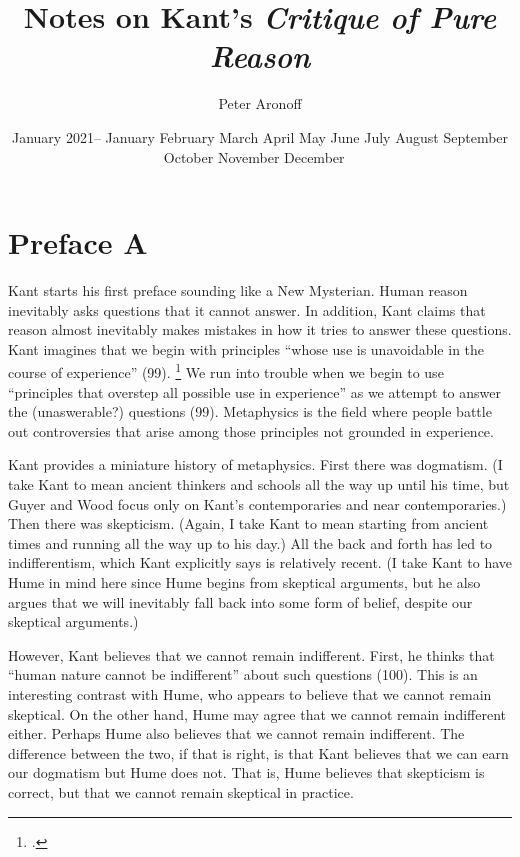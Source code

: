 \documentclass[12pt,letterpaper]{article}
\newcommand{\MONTH}{%
  \ifcase\the\month
  \or January%
  \or February%
  \or March%
  \or April%
  \or May%
  \or June%
  \or July%
  \or August%
  \or September%
  \or October%
  \or November%
  \or December%
  \fi}
\begin{document}
\begin{titlepage}
\title{Notes on Kant's \textit{Critique of Pure Reason}}
\author{Peter Aronoff}
\date{January 2021--\MONTH\ \the\year}
\maketitle
\thispagestyle{empty}
\end{titlepage}

\pagestyle{notes}

\section*{Preface A}

Kant starts his first preface sounding like a New Mysterian.
Human reason inevitably asks questions that it cannot answer.
In addition, Kant claims that reason almost inevitably makes mistakes in how it tries to answer these questions.
Kant imagines that we begin with principles ``whose use is unavoidable in the course of experience'' (99).%
\footcite[Unless I say otherwise, all references to Kant's first critique come from][]{critique-pure-reason-cambridge-1998}
We run into trouble when we begin to use ``principles that overstep all possible use in experience'' as we attempt to answer the (unaswerable?) questions (99).
Metaphysics is the field where people battle out controversies that arise among those principles not grounded in experience.

Kant provides a miniature history of metaphysics.
First there was dogmatism.
(I take Kant to mean ancient thinkers and schools all the way up until his time, but Guyer and Wood focus only on Kant's contemporaries and near contemporaries.)
Then there was skepticism.
(Again, I take Kant to mean starting from ancient times and running all the way up to his day.)
All the back and forth has led to indifferentism, which Kant explicitly says is relatively recent.
(I take Kant to have Hume in mind here since Hume begins from skeptical arguments, but he also argues that we will inevitably fall back into some form of belief, despite our skeptical arguments.)

However, Kant believes that we cannot remain indifferent.
First, he thinks that ``human nature cannot be indifferent'' about such questions (100).
This is an interesting contrast with Hume, who appears to believe that we cannot remain skeptical.
On the other hand, Hume may agree that we cannot remain indifferent either.
Perhaps Hume also believes that we cannot remain indifferent.
The difference between the two, if that is right, is that Kant believes that we can earn our dogmatism but Hume does not.
That is, Hume believes that skepticism is correct, but that we cannot remain skeptical in practice.
\end{document}
